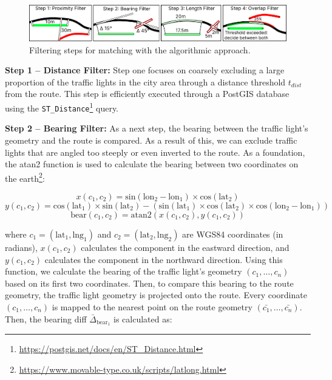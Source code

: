 \begin{figure}[t]
\centering
\includegraphics[width=\linewidth]{images/sg-matching-filters.pdf}
\caption{Filtering steps for matching with the algorithmic approach.}
\label{fig:sg-matching-filters}
\end{figure}

\textbf{\color{cidarkblue}Step 1 -- Distance Filter:} Step one focuses on coarsely excluding a large proportion of the traffic lights in the city area through a distance threshold $t_{dist}$ from the route. This step is efficiently executed through a PostGIS database using the \texttt{ST\_Distance}\footnote{\url{https://postgis.net/docs/en/ST\_Distance.html}} query.

\textbf{\color{cidarkblue}Step 2 -- Bearing Filter:} As a next step, the bearing between the traffic light's geometry and the route is compared. As a result of this, we can exclude traffic lights that are angled too steeply or even inverted to the route. As a foundation, the atan2 function is used to calculate the bearing between two coordinates on the earth\footnote{\url{https://www.movable-type.co.uk/scripts/latlong.html}}:

\begin{equation}
x(c_1, c_2) = \text{sin}(\text{lon}_2 - \text{lon}_1) \times \text{cos}(\text{lat}_2)
\end{equation}
\begin{equation}
y(c_1, c_2) = \text{cos}(\text{lat}_1) \times \text{sin}(\text{lat}_2) - (\text{sin}(\text{lat}_1) \times \text{cos}(\text{lat}_2) \times \text{cos}(\text{lon}_2 - \text{lon}_1))
\end{equation}
\begin{equation}
\text{bear}(c_1, c_2) = \text{atan2}(x(c_1, c_2), y(c_1, c_2))
\end{equation}

where $c_1 = (\text{lat}_1, \text{lng}_1)$ and $c_2 = (\text{lat}_2, \text{lng}_2)$ are WGS84 coordinates (in radians), $x(c_1, c_2)$ calculates the component in the eastward direction, and $y(c_1, c_2)$ calculates the component in the northward direction. Using this function, we calculate the bearing of the traffic light's geometry $(c_1, \dots, c_n)$ based on its first two coordinates. Then, to compare this bearing to the route geometry, the traffic light geometry is projected onto the route. Every coordinate $(c_1, \dots, c_n)$ is mapped to the nearest point on the route geometry $(\bar{c_1}, \dots, \bar{c_n})$. Then, the bearing diff $\bar{\Delta}_{\text{bear}_1}$ is calculated as:

